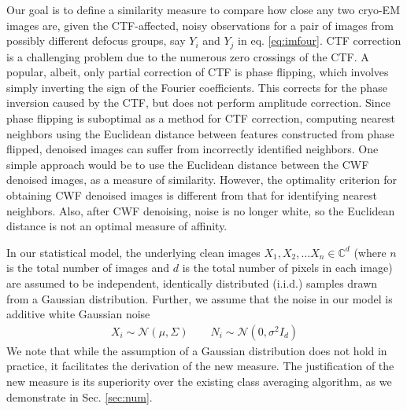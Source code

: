 Our goal is to define a similarity measure to compare how close any two cryo-EM images are, given the CTF-affected, noisy observations for a pair of images from possibly different defocus groups, say $Y_i$ and $Y_j$ in eq. \ref{eq:imfour}.
CTF correction is a challenging problem due to the numerous zero crossings of the CTF. A popular, albeit, only partial correction of CTF is phase flipping, which involves simply inverting the sign of the Fourier coefficients. This corrects for the phase inversion caused by the CTF, but does not perform amplitude correction. Since phase flipping is suboptimal as a method for CTF correction, computing nearest neighbors using the Euclidean distance between features constructed from phase flipped, denoised images can suffer from incorrectly identified neighbors. One simple approach would be to use the Euclidean distance between the CWF denoised images, as a measure of similarity. However, the optimality criterion for obtaining CWF denoised images is different from that for identifying nearest neighbors. Also, after CWF denoising, noise is no longer white, so the Euclidean distance is not an optimal measure of affinity.  

In our statistical model, the underlying clean images $X_1, X_2, \ldots X_n \in \mathbb{C}^{d}$ (where $n$ is the total number of images and $d$ is the total number of pixels in each image) are assumed to be independent, identically distributed (i.i.d.) samples drawn from a Gaussian distribution. Further, we assume that the noise in our model is additive white Gaussian noise 
\begin{eqnarray} 
X_i  \sim \mathcal{N}( {\mu},\Sigma) \quad \quad
N_i  \sim \mathcal{N}(0,{\sigma}^2 I_d )
\end{eqnarray}
We note that while the assumption of a Gaussian distribution does not hold in practice, it facilitates the derivation of the new measure. The justification of the new measure is its superiority over the existing class averaging algorithm, as we demonstrate in Sec. \ref{sec:num}.

